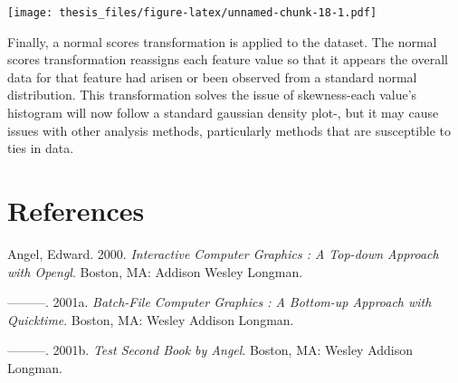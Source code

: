 \documentclass[12pt,twoside]{dukestatscithesis}
\theoremstyle{definition}
\theoremstyle{definition}
\theoremstyle{definition}
\theoremstyle{remark}
\begin{document}
\begin{Shaded}
\begin{Highlighting}[]
\StringTok{ }
\StringTok{ }

\StringTok{ }
\StringTok{ }

\StringTok{ }
\StringTok{ }
\NormalTok{(}\NormalTok{(}\NormalTok{,}\NormalTok{))}
\end{Highlighting}
\end{Shaded}
\texttt{[image: thesis\_files/figure-latex/unnamed-chunk-18-1.pdf]}

Finally, a normal scores transformation is applied to the dataset. The
normal scores transformation reassigns each feature value so that it
appears the overall data for that feature had arisen or been observed
from a standard normal distribution. This transformation solves the
issue of skewness-each value's histogram will now follow a standard
gaussian density plot-, but it may cause issues with other analysis
methods, particularly methods that are susceptible to ties in data.

\backmatter

\chapter*{References}\label{references}


\noindent

\setlength{\parindent}{-0.20in} \setlength{\leftskip}{0.20in}
\setlength{\parskip}{8pt}

\hypertarget{refs}{}
\hypertarget{ref-angel2000}{}
Angel, Edward. 2000. \emph{Interactive Computer Graphics : A Top-down
Approach with Opengl}. Boston, MA: Addison Wesley Longman.

\hypertarget{ref-angel2001}{}
---------. 2001a. \emph{Batch-File Computer Graphics : A Bottom-up
Approach with Quicktime}. Boston, MA: Wesley Addison Longman.

\hypertarget{ref-angel2002a}{}
---------. 2001b. \emph{Test Second Book by Angel}. Boston, MA: Wesley
Addison Longman.


\end{document}

